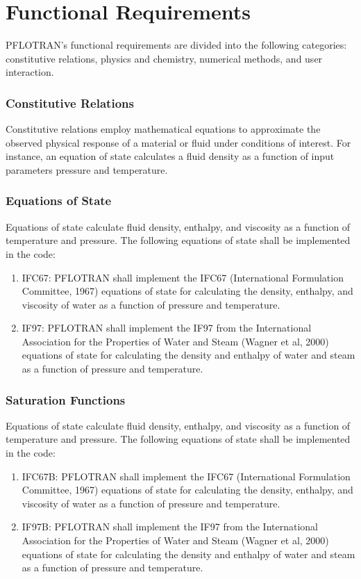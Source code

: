 \documentclass{report}
\begin{document}
\section{Functional Requirements}
PFLOTRAN’s functional requirements are divided into the following categories: constitutive relations, physics and chemistry, numerical methods, and user interaction.
\subsubsection{Constitutive Relations}
Constitutive relations employ mathematical equations to approximate the observed physical response of a material or fluid under conditions of interest. For instance, an equation of state calculates a fluid density as a function of input parameters pressure and temperature.
\subsubsection{Equations of State}
Equations of state calculate fluid density, enthalpy, and viscosity as a function of temperature and pressure. The following equations of state shall be implemented in the code:
\begin{enumerate}[label=EOS \arabic*.,ref=EOS \arabic*,nosep]
	\item IFC67: \label{ifc67} PFLOTRAN shall implement the IFC67 (International Formulation Committee, 1967) equations of state for calculating the density, enthalpy, and viscosity of water as a function of pressure and temperature.
	\item IF97: \label{if97} PFLOTRAN shall implement the IF97 from the International Association for the Properties of Water and Steam (Wagner et al, 2000) equations of state for calculating the density and enthalpy of water and steam as a function of pressure and temperature.
\end{enumerate}
\subsubsection{Saturation Functions}
Equations of state calculate fluid density, enthalpy, and viscosity as a function of temperature and pressure. The following equations of state shall be implemented in the code:
\begin{enumerate}[label=EOS \arabic*.,ref=EOS \arabic*,nosep,resume]
	\item IFC67B: \label{ifc67b} PFLOTRAN shall implement the IFC67 (International Formulation Committee, 1967) equations of state for calculating the density, enthalpy, and viscosity of water as a function of pressure and temperature.
	\item IF97B: \label{if97b} PFLOTRAN shall implement the IF97 from the International Association for the Properties of Water and Steam (Wagner et al, 2000) equations of state for calculating the density and enthalpy of water and steam as a function of pressure and temperature.
\end{enumerate}
\end{document}
